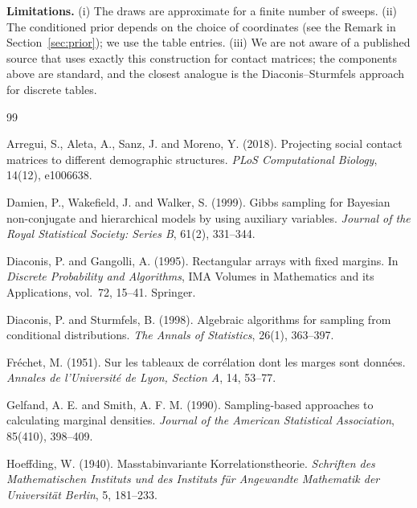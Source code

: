 \documentclass[11pt,a4paper]{article}
\theoremstyle{definition}
\theoremstyle{remark}
\begin{document}
\noindent
\textbf{Limitations.}
(i) The draws are approximate for a finite number of sweeps.
(ii) The conditioned prior depends on the choice of coordinates (see the
Remark in Section~\ref{sec:prior}); we use the table entries.
(iii) We are not aware of a published source that uses exactly this
construction for contact matrices; the components above are standard, and
the closest analogue is the Diaconis--Sturmfels approach for discrete tables.

\begin{thebibliography}{99}

Arregui, S., Aleta, A., Sanz, J. and Moreno, Y. (2018).
Projecting social contact matrices to different demographic structures.
\emph{PLoS Computational Biology}, 14(12), e1006638.

Damien, P., Wakefield, J. and Walker, S. (1999).
Gibbs sampling for Bayesian non-conjugate and hierarchical models by using
auxiliary variables.
\emph{Journal of the Royal Statistical Society: Series B}, 61(2), 331--344.

Diaconis, P. and Gangolli, A. (1995).
Rectangular arrays with fixed margins.
In \emph{Discrete Probability and Algorithms}, IMA Volumes in Mathematics and
its Applications, vol.~72, 15--41. Springer.

Diaconis, P. and Sturmfels, B. (1998).
Algebraic algorithms for sampling from conditional distributions.
\emph{The Annals of Statistics}, 26(1), 363--397.

Fr\'echet, M. (1951).
Sur les tableaux de corr\'elation dont les marges sont donn\'ees.
\emph{Annales de l'Universit\'e de Lyon, Section A}, 14, 53--77.

Gelfand, A. E. and Smith, A. F. M. (1990).
Sampling-based approaches to calculating marginal densities.
\emph{Journal of the American Statistical Association}, 85(410), 398--409.

Hoeffding, W. (1940).
Masstabinvariante Korrelationstheorie.
\emph{Schriften des Mathematischen Instituts und des Instituts f\"ur
Angewandte Mathematik der Universit\"at Berlin}, 5, 181--233.


\end{thebibliography}
\end{document}
